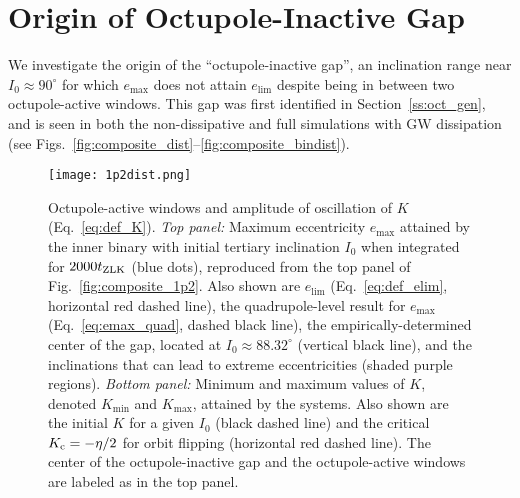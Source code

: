 \documentclass[
        fleqn,
        usenatbib,
    ]{mnras}
\begin{document}



\clearpage
\onecolumn

\appendix

\section{Origin of Octupole-Inactive Gap}\label{app:gap}

We investigate the origin of the ``octupole-inactive gap'', an
inclination range near $I_0 \approx 90^\circ$ for which $e_{\max}$ does not
attain $e_{\lim}$ despite being in between two octupole-active windows. This gap
was first identified in Section~\ref{ss:oct_gen}, and is seen in both the
non-dissipative and full simulations with GW dissipation (see
Figs.~\ref{fig:composite_dist}--\ref{fig:composite_bindist}).

\begin{figure}
    \centering
    \texttt{[image: 1p2dist.png]}
    \caption{Octupole-active windows and amplitude of oscillation of $K$
    (Eq.~\ref{eq:def_K}). \emph{Top panel:} Maximum eccentricity $e_{\max}$
    attained by the inner binary with initial tertiary inclination $I_0$ when
    integrated for $2000 t_{\rm ZLK}$ (blue dots), reproduced from the top panel
    of Fig.~\ref{fig:composite_1p2}. Also shown are $e_{\lim}$
    (Eq.~\ref{eq:def_elim}, horizontal red dashed line), the quadrupole-level
    result for $e_{\max}$ (Eq.~\ref{eq:emax_quad}, dashed black line), the
    empirically-determined center of the gap, located at $I_0 \approx
    88.32^\circ$ (vertical black line), and the inclinations that can lead to
    extreme eccentricities (shaded purple regions). \emph{Bottom panel:} Minimum and maximum
    values of $K$, denoted $K_{\min}$ and $K_{\max}$, attained by the systems.
    Also shown are the initial $K$ for a given $I_0$ (black dashed line) and the
    critical $K_{\rm c} = -\eta / 2$ for orbit flipping (horizontal red dashed
    line). The center of the octupole-inactive gap and the octupole-active
    windows are labeled as in the top panel.
    }\label{fig:kdist}
\end{figure}
\end{document}
